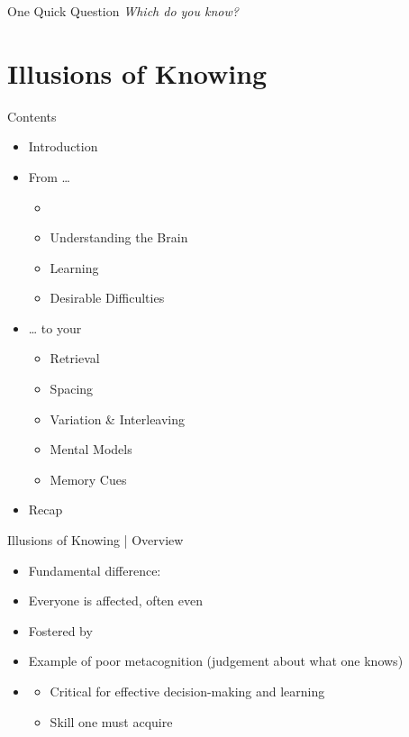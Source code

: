 \documentclass{ercisbeamer}
\begin{document}
\begin{frame}{One Quick Question}
    \centering \emph{Which  do you know?}
\end{frame}

\section{Illusions of Knowing}
\begin{frame}{Contents}
    \begin{itemize}
        \item Introduction
        \item From …
        \begin{itemize}
            \item {}
            \item Understanding the Brain
            \item Learning
            \item Desirable Difficulties
        \end{itemize}
        \item … to your 
        \begin{itemize}
            \item Retrieval
            \item Spacing
            \item Variation \& Interleaving
            \item Mental Models
            \item Memory Cues
        \end{itemize}
        \item Recap
    \end{itemize}
\end{frame}

\begin{frame}{Illusions of Knowing | Overview}
    \begin{tbox}
        \begin{itemize}
            \item Fundamental difference: 
            \item Everyone is affected, often  even 
            \item Fostered by 
            \item Example of poor metacognition (judgement about what one knows)
            \item {}
            \begin{itemize}
                \item Critical for effective decision-making and learning
                \item Skill one must acquire
            \end{itemize}
        \end{itemize}
    \end{tbox}
\end{frame}
\end{document}
